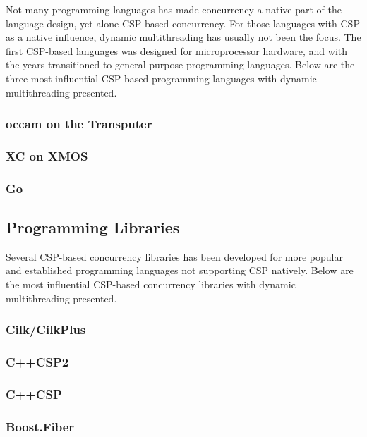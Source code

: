 Not many programming languages has made concurrency a native part of the language design, yet alone CSP\hyp{}based concurrency. For those languages with CSP as a native influence, dynamic multithreading has usually not been the focus. The first CSP\hyp{}based languages was designed for microprocessor hardware, and with the years transitioned to general\hyp{}purpose programming languages. Below are the three most influential CSP\hyp{}based programming languages with dynamic multithreading presented.


\subsubsection{occam on the Transputer}


\subsubsection{XC on XMOS}


\subsubsection{Go}


\subsection{Programming Libraries}


Several CSP\hyp{}based concurrency libraries has been developed for more popular and established programming languages not supporting CSP natively. Below are the most influential CSP\hyp{}based concurrency libraries with dynamic multithreading presented.


\subsubsection{Cilk/CilkPlus}


\subsubsection{C++CSP2}


\subsubsection{C++CSP}


\subsubsection{Boost.Fiber}

